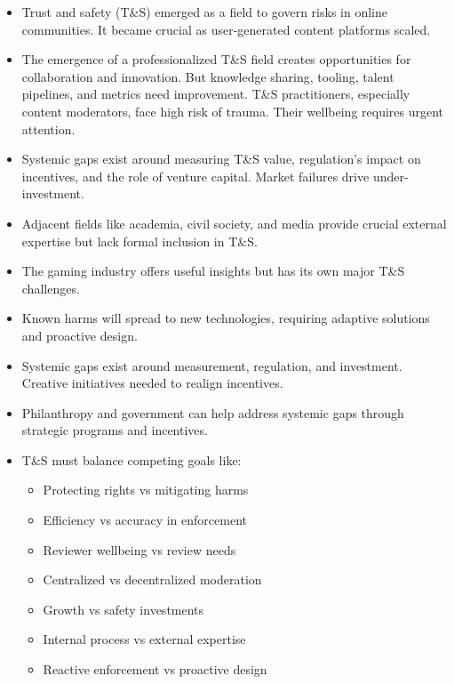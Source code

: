 \begin{itemize}
\item Trust and safety (T\&S) emerged as a field to govern risks in online communities. It became crucial as user-generated content platforms scaled.
\item The emergence of a professionalized T\&S field creates opportunities for collaboration and innovation. But knowledge sharing, tooling, talent pipelines, and metrics need improvement.
T\&S practitioners, especially content moderators, face high risk of trauma. Their wellbeing requires urgent attention.
\item Systemic gaps exist around measuring T\&S value, regulation's impact on incentives, and the role of venture capital. Market failures drive under-investment.
\item Adjacent fields like academia, civil society, and media provide crucial external expertise but lack formal inclusion in T\&S.
\item The gaming industry offers useful insights but has its own major T\&S challenges.
\item Known harms will spread to new technologies, requiring adaptive solutions and proactive design.
\item Systemic gaps exist around measurement, regulation, and investment. Creative initiatives needed to realign incentives.
\item Philanthropy and government can help address systemic gaps through strategic programs and incentives.

\item T\&S must balance competing goals like:
\begin{itemize}
\item Protecting rights vs mitigating harms
\item Efficiency vs accuracy in enforcement
\item Reviewer wellbeing vs review needs
\item Centralized vs decentralized moderation
\item Growth vs safety investments
\item Internal process vs external expertise
\item Reactive enforcement vs proactive design
\end{itemize}

\end{itemize}
